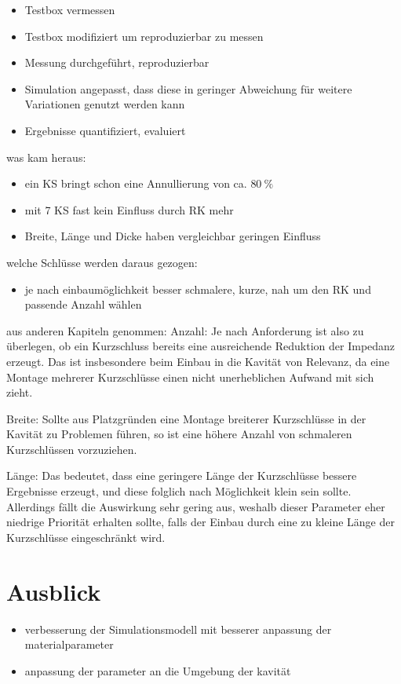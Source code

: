 \begin{itemize}
    \item Testbox vermessen
    \item Testbox modifiziert um reproduzierbar zu messen
    \item Messung durchgef\"uhrt, reproduzierbar
    \item Simulation angepasst, dass diese in geringer Abweichung f\"ur weitere Variationen genutzt werden kann
    \item Ergebnisse quantifiziert, evaluiert
\end{itemize}
was kam heraus:
\begin{itemize}
    \item ein KS bringt schon eine Annullierung von ca. $80~\%$
    \item mit 7 KS fast kein Einfluss durch RK mehr
    \item Breite, Länge und Dicke haben vergleichbar geringen Einfluss
\end{itemize}
welche Schlüsse werden daraus gezogen:
\begin{itemize}
    \item je nach einbaumöglichkeit besser schmalere, kurze, nah um den RK und passende Anzahl wählen
\end{itemize}
\par 
aus anderen Kapiteln genommen:
Anzahl:
Je nach Anforderung ist also zu \"uberlegen, ob ein Kurzschluss bereits eine ausreichende Reduktion der Impedanz erzeugt. Das ist insbesondere beim Einbau in die Kavit\"at von Relevanz, da eine Montage mehrerer Kurzschl\"usse einen nicht unerheblichen Aufwand mit sich zieht. 

Breite:
Sollte aus Platzgr\"unden eine Montage breiterer Kurzschl\"usse in der Kavit\"at zu Problemen f\"uhren, so ist eine h\"ohere Anzahl von schmaleren Kurzschl\"ussen vorzuziehen. 

Länge:
Das bedeutet, dass eine geringere L\"ange der Kurzschl\"usse bessere Ergebnisse erzeugt, und diese folglich nach M\"oglichkeit klein sein sollte. Allerdings f\"allt die Auswirkung sehr gering aus, weshalb dieser Parameter eher niedrige Priorit\"at erhalten sollte, falls der Einbau durch eine zu kleine L\"ange der Kurzschl\"usse eingeschr\"ankt wird.

\section{Ausblick}
\begin{itemize}
    \item verbesserung der Simulationsmodell mit besserer anpassung der materialparameter
    \item anpassung der parameter an die Umgebung der kavität
    
\end{itemize}
